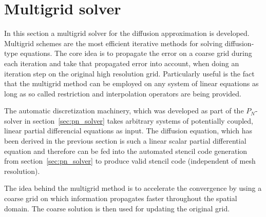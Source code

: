 \section{Multigrid solver}
\label{sec:da_solver}

In this section a multigrid solver for the diffusion approximation is developed. Multigrid schemes are the most efficient iterative methods for solving diffusion-type equations. The core idea is to propagate the error on a coarse grid during each iteration and take that propagated error into account, when doing an iteration step on the original high resolution grid. Particularly useful is the fact that the multigrid method can be employed on any system of linear equations as long as so called restriction and interpolation operators are being provided. 

The automatic discretization machinery, which was developed as part of the $P_N$-solver in section~\ref{sec:pn_solver} takes arbitrary systems of potentially coupled, linear partial differencial equations as input. The diffusion equation, which has been derived in the previous section is such a linear scalar partial differential equation and therefore can be fed into the automated stencil code generation from section~\ref{sec:pn_solver} to produce valid stencil code (independent of mesh resolution).

The idea behind the multigrid method is to accelerate the convergence by using a coarse grid on which information propagates faster throughout the spatial domain. The coarse solution is then used for updating the original grid.

